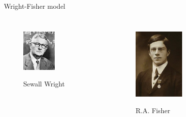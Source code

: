 \begin{frame}{Wright-Fisher model}

	\begin{columns}


                \begin{figure}
                        \includegraphics[width=0.5\textwidth]{Pics/wright} \\
			\caption{Sewall Wright}
                \end{figure}


 		\begin{figure}
                        \includegraphics[width=0.5\textwidth]{Pics/fisher} \\
                        \caption{R.A. Fisher}
                \end{figure}

        \end{columns}

\end{frame}


